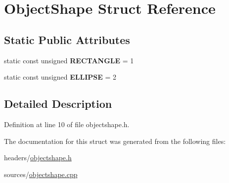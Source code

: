 \hypertarget{structObjectShape}{}\section{Object\+Shape Struct Reference}
\label{structObjectShape}
\subsection*{Static Public Attributes}
\begin{DoxyCompactItemize}
\item 
\hypertarget{structObjectShape_a37b224be8af923a9557b47179c608621}{}static const unsigned {\bfseries R\+E\+C\+T\+A\+N\+G\+L\+E} = 1\label{structObjectShape_a37b224be8af923a9557b47179c608621}

\item 
\hypertarget{structObjectShape_ab715c818a8afa39d34923ce0974e1328}{}static const unsigned {\bfseries E\+L\+L\+I\+P\+S\+E} = 2\label{structObjectShape_ab715c818a8afa39d34923ce0974e1328}

\end{DoxyCompactItemize}


\subsection{Detailed Description}


Definition at line 10 of file objectshape.\+h.



The documentation for this struct was generated from the following files\+:\begin{DoxyCompactItemize}
\item 
headers/\hyperlink{objectshape_8h}{objectshape.\+h}\item 
sources/\hyperlink{objectshape_8cpp}{objectshape.\+cpp}\end{DoxyCompactItemize}
